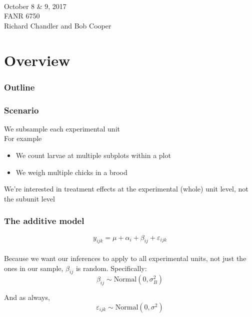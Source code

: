 \documentclass[color=usenames,dvipsnames]{beamer}\usepackage[]{graphicx}\usepackage[]{color}
\begin{document}



\begin{frame}[plain]
  \LARGE
  \centering
  {\color{RoyalBlue}{\bf Lab 8 -- Nested ANOVA} \\}
  \vspace{1cm}
  \Large
  October 8 \& 9, 2017 \\
  FANR 6750 \\
  \vfill
  \large
  Richard Chandler and Bob Cooper
\end{frame}







\section{Overview}



\begin{frame}
  \frametitle{Outline}
  \Large
\end{frame}




\begin{frame}
  \frametitle{Scenario}
  \large
  We subsample each experimental unit \\
  \pause
  \vfill
  For example
      \begin{itemize}
        \large
        \item We count larvae at multiple subplots within a plot
        \item We weigh multiple chicks in a brood
      \end{itemize}
  \pause
  \vfill
  We're interested in treatment effects at the experimental (whole) unit
  level, not the subunit level
\end{frame}




\begin{frame}
  \frametitle{The additive model}
  \large
\[
y_{ijk} = \mu + \alpha_i + \beta_{ij} + \varepsilon_{ijk}
\] \\
\vspace{1cm}
\pause
\large
Because we want our inferences to apply to all experimental units, not
just the ones in our sample, $\beta_{ij}$ is random.
\pause
\vfill
Specifically:
\[
\beta_{ij} \sim \mbox{Normal}(0, \sigma^2_B)
\]

\pause
\large
And as always,
\[
\varepsilon_{ijk} \sim \mbox{Normal}(0, \sigma^2)
\]
\end{frame}
\end{document}
